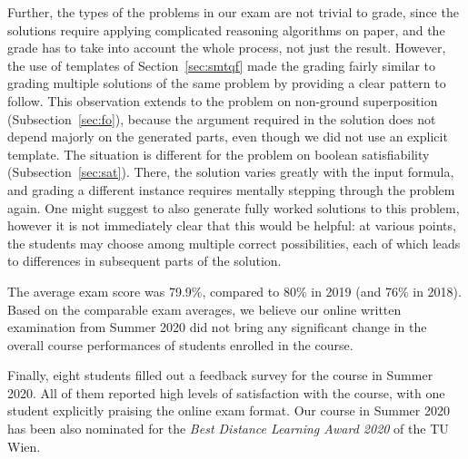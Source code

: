 Further, the types of the problems in our exam are not trivial to grade, since
the solutions require applying complicated reasoning algorithms on paper, and
the grade has to take into account the whole process, not just the result.
However, the use of templates of Section~\ref{sec:smtqf}
made the grading fairly similar to grading multiple
solutions of the same problem by providing a clear pattern to follow.
%
This observation extends to %
the problem on non-ground superposition (Subsection~\ref{sec:fo}),
because the argument required in the solution does not depend majorly on the generated parts,
even though we did not use an explicit template.
%
The situation is different for %
the problem on boolean satisfiability (Subsection~\ref{sec:sat}).
There, the solution varies greatly with the input formula,
and grading a different instance requires mentally stepping through the problem again.
One might suggest to also generate fully worked solutions to this problem,
however it is not immediately clear that this would be helpful:
at various points, the students may choose among multiple correct possibilities,
each of which leads to differences in subsequent parts of the solution.

The average exam score was 79.9\%, compared to 80\% in 2019 (and 76\%
in 2018). Based on the comparable exam averages, we believe
our online written examination from Summer 2020 did not bring any
significant change in the overall course performances of students
enrolled in the course. %

Finally, eight students filled out a feedback survey for the course in
Summer 2020. All of them reported
high levels of satisfaction with the course, with one student explicitly praising the
online exam format. Our course in Summer 2020 has been also nominated
for the {\it Best Distance Learning Award 2020} of the TU Wien. 

